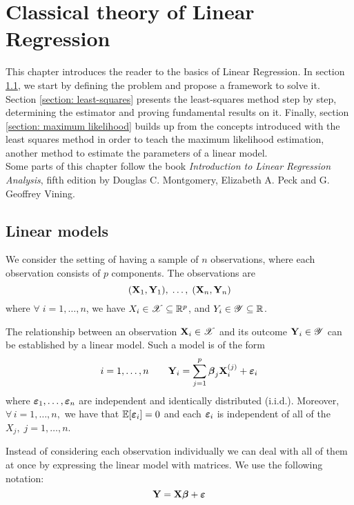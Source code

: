 \chapter{Classical theory of Linear Regression}
\label{chapter: classical theory of linear regression}

This chapter introduces the reader to the basics of Linear Regression. In section \ref{section: linear models}, we start by defining the problem and propose a framework to solve it. Section \ref{section: least-squares} presents the least-squares method step by step, determining the estimator and proving fundamental results on it. Finally, section \ref{section: maximum likelihood} builds up from the concepts introduced with the least squares method in order to teach the maximum likelihood estimation, another method to estimate the parameters of a linear model. \\
Some parts of this chapter follow the book \textit{Introduction to Linear Regression Analysis}, fifth edition by Douglas C. Montgomery, Elizabeth A. Peck and G. Geoffrey Vining.

\section{Linear models}
\label{section: linear models}

We consider the setting of having a sample of $n$ observations, where each observation consists of \(p\) components. The observations are
\[
    (\mathbf{X}_1, \mathbf{Y}_1), \; \ldots , \;(\mathbf{X}_n, \mathbf{Y}_n)
\]
where \(\forall \; i = 1, \ldots, n\), we have \(X_i \in \mathscr{X} \subseteq \mathbb{R}^p\), and \(Y_i \in \mathscr{Y} \subseteq \mathbb{R}\).

\begin{definition}
    The relationship between an observation $\mathbf{X}_i \in \mathscr{X}$ and its outcome $\mathbf{Y}_i \in \mathscr{Y}$ can be established by a linear model. Such a model is of the form
    \begin{equation}
        i = 1, \ldots, n \qquad \mathbf{Y}_{i} = \sum_{j=1}^{p} \boldsymbol{\beta}_{j} \mathbf{X}_{i}^{(j)} + \boldsymbol{\varepsilon}_{i}
    \end{equation}
    where \(\boldsymbol{\varepsilon}_1, \ldots, \boldsymbol{\varepsilon}_n\) are independent and identically distributed (i.i.d.). Moreover, \(\forall \, i = 1, \ldots, n, \) we have that \( \mathbb{E} [\boldsymbol{\varepsilon}_i] = 0\) and each \(\boldsymbol{\varepsilon}_i\) is independent of all of the \( X_j, \; j=1, \ldots, n \).
\end{definition}
Instead of considering each observation individually we can deal with all of them at once by expressing the linear model with matrices. We use the following notation:
\begin{equation}
    \label{eqn: linear model (matrix)}
    \mathbf{Y} = \mathbf{X} \boldsymbol{\beta} + \boldsymbol{\varepsilon}
\end{equation}

